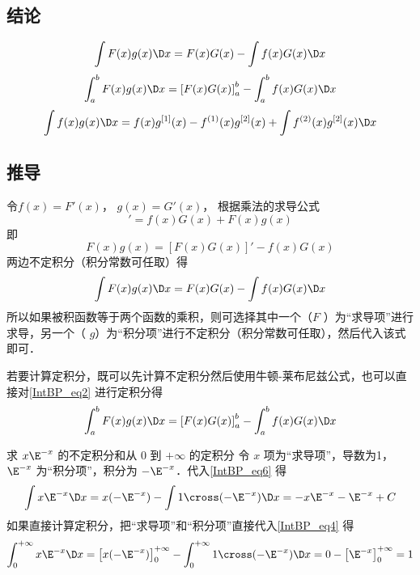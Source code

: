 
\subsection{结论}
\begin{equation}\label{IntBP_eq1}
\int {F(x)g(x)\D x}  = F(x)G(x) - \int {f(x)G(x)\D x}
\end{equation}
\begin{equation}
\int_a^b {F(x)g(x)\D x}  = \left[ {F(x)G(x)} \right]_a^b - \int_a^b {f(x)G(x)\D x}
\end{equation}
\begin{equation}
\int {f(x)g(x)\D x}  = f(x){g^{[1]}}(x) - {f^{(1)}}(x){g^{[2]}}(x) + \int {{f^{(2)}}(x){g^{[2]}}(x)\D x}
\end{equation}

\subsection{推导}
令$f(x) = F'(x)$，  $g(x) = G'(x)$， 根据乘法的求导公式%
\begin{equation}
[F(x)G(x)]' = f(x)G(x) + F(x)g(x)
\end{equation}
即
\begin{equation}\label{IntBP_eq2}
F(x)g(x) = [F(x)G(x)]' - f(x)G(x)
\end{equation}
两边不定积分（积分常数可任取）得
\begin{equation}\label{IntBP_eq6}
\int {F(x)g(x)\D x}  = F(x)G(x) - \int {f(x)G(x)\D x}
\end{equation}
所以如果被积函数等于两个函数的乘积，则可选择其中一个（$F$ ）为“求导项”进行求导，另一个（ $g$）为“积分项”进行不定积分（积分常数可任取），然后代入该式即可．

若要计算定积分，既可以先计算不定积分然后使用牛顿-莱布尼兹公式，也可以直接对\autoref{IntBP_eq2} 进行定积分得
\begin{equation}\label{IntBP_eq4}
\int_a^b {F(x)g(x)\D x}  = \left[ {F(x)G(x)} \right]_a^b - \int_a^b {f(x)G(x)\D x}
\end{equation}

\begin{exam}{求 $x{\E^{ - x}}$ 的不定积分和从 $0$ 到 $+\infty$ 的定积分}
令 $x$ 项为“求导项”，导数为1， ${\E^{ - x}}$ 为“积分项”，积分为 $- {\E^{ - x}}$．代入\autoref{IntBP_eq6} 得
\begin{equation}
\int {x{\E^{ - x}}\D x}  = x( - {\E^{ - x}}) - \int {1 \cross ( - {\E^{ - x}})\D x}  =  - x{\E^{ - x}} - {\E^{ - x}} + C
\end{equation}
如果直接计算定积分，把“求导项”和“积分项”直接代入\autoref{IntBP_eq4} 得
\begin{equation}
\int_0^{ + \infty } {x{\E^{ - x}}\D x}  = \left[ {x( - {\E^{ - x}})} \right]_0^{ + \infty } - \int_0^{ + \infty } {1 \cross ( - {\E^{ - x}})\D x}  = 0 - \left[ {{\E^{ - x}}} \right]_0^{ + \infty } = 1
\end{equation}
\end{exam}

